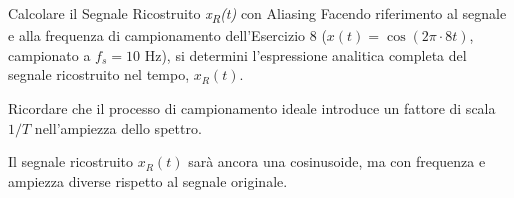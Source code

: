 
\begin{esercizio}{Calcolare il Segnale Ricostruito \textit{x\textsubscript{R}(t)} con Aliasing}
    Facendo riferimento al segnale e alla frequenza di campionamento dell'Esercizio 8 ($x(t) = \cos(2\pi \cdot 8t)$, campionato a $f_s = 10$ Hz), si determini l'espressione analitica completa del segnale ricostruito nel tempo, $x_R(t)$.
    
    Ricordare che il processo di campionamento ideale introduce un fattore di scala $1/T$ nell'ampiezza dello spettro.
    
    Il segnale ricostruito $x_R(t)$ sarà ancora una cosinusoide, ma con frequenza e ampiezza diverse rispetto al segnale originale.
\end{esercizio}
